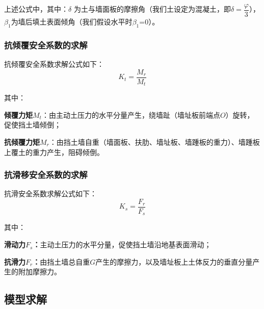 \documentclass[withoutpreface,bwprint]{cumcmthesis}
\begin{document}
    上述公式中，其中：$\delta$ 为土与墙面板的摩擦角（我们土设定为混凝土，即$\delta = \dfrac{\varphi}{3}$），
    $\beta_1$为墙后填土表面倾角（我们假设水平时$\beta_1$=0）。
    \par



\subsubsection{抗倾覆安全系数的求解}
抗倾覆安全系数求解公式如下：
    \begin{equation}
        K_t=\frac{M_r}{M_t}
    \end{equation}
    \par
其中：
\par
    \textbf{倾覆力矩$M_t$}：由主动土压力的水平分量产生，绕墙趾（墙址板前端点$O$）旋转，促使挡土墙倾倒；
 \par   
 \textbf{抗倾覆力矩$M_r$}：由挡土墙自重（墙面板、扶肋、墙址板、墙踵板的重力）、墙踵板上覆土的重力产生，阻碍倾倒。


\subsubsection{抗滑移安全系数的求解}
抗滑安全系数求解公式如下：
    \begin{equation}
        K_s=\frac{F_r}{F_s}
    \end{equation}
    \par
其中：
\par
\textbf{滑动力$F_s$：}主动土压力的水平分量，促使挡土墙沿地基表面滑动；
\par
\textbf{抗滑力$F_r$：}由挡土墙总自重$G$产生的摩擦力，以及墙址板上土体反力的垂直分量产生的附加摩擦力。

\subsection{模型求解}
\end{document}
